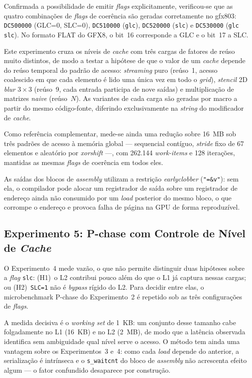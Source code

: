 Confirmada a possibilidade de emitir \textit{flags} explicitamente, verificou-se que as quatro combinações de \textit{flags} de coerência são geradas corretamente no gfx803: \texttt{DC500000} (GLC=0, SLC=0), \texttt{DC510000} (\texttt{glc}), \texttt{DC520000} (\texttt{slc}) e \texttt{DC530000} (\texttt{glc slc}). No formato FLAT do GFX8, o bit~16 corresponde a GLC e o bit~17 a SLC.

Este experimento cruza os níveis de \textit{cache} com três cargas de fatores de reúso muito distintos, de modo a testar a hipótese de que o valor de um \textit{cache} depende do reúso temporal do padrão de acesso: \textit{streaming} puro (reúso~1, acesso coalescido em que cada elemento é lido uma única vez em todo o \textit{grid}), \textit{stencil} 2D \textit{blur} $3\times3$ (reúso~9, cada entrada participa de nove saídas) e multiplicação de matrizes \textit{naive} (reúso~$N$). As variantes de cada carga são geradas por macro a partir do mesmo código-fonte, diferindo exclusivamente na \textit{string} do modificador de \textit{cache}.

Como referência complementar, mede-se ainda uma redução sobre 16~MB sob três padrões de acesso à memória global --- sequencial contíguo, \textit{stride} fixo de 67 elementos e aleatório por \textit{xorshift} ---, com 262.144 \textit{work-items} e 128 iterações, mantidas as mesmas \textit{flags} de coerência em todos eles.

As saídas dos blocos de \textit{assembly} utilizam a restrição \textit{earlyclobber} (\texttt{"=\&v"}): sem ela, o compilador pode alocar um registrador de saída sobre um registrador de endereço ainda não consumido por um \textit{load} posterior do mesmo bloco, o que corrompe o endereço e provoca falha de página na GPU de forma reproduzível.

\subsection{Experimento 5: P-chase com Controle de Nível de \textit{Cache}}

O Experimento~4 mede vazão, o que não permite distinguir duas hipóteses sobre a \textit{flag} \texttt{slc}: (H1)~o L2 contribui pouco além do que o L1 já captura nessas cargas; ou (H2)~\texttt{SLC=1} não é \textit{bypass} rígido do L2. Para decidir entre elas, o microbenchmark P-chase do Experimento~2 é repetido sob as três configurações de \textit{flags}.

A medida decisiva é o \textit{working set} de 1~KB: um conjunto desse tamanho cabe folgadamente no L1 (16~KB) e no L2 (2~MB), de modo que a latência observada identifica sem ambiguidade qual nível serve o acesso. O método tem ainda uma vantagem sobre os Experimentos~3 e~4: como cada \textit{load} depende do anterior, a serialização é intrínseca e o \texttt{s\_waitcnt} do bloco de \textit{assembly} não acrescenta efeito algum --- o fator confundido desaparece por construção.

